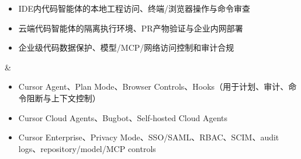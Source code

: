 \begin{longtblr}[
  caption = {北美主流AI智能体安全产品与落地方向},
  label   = {tab:north-america-agent-security-products},
]
\begin{itemize}[leftmargin=*,topsep=0pt,partopsep=0pt,itemsep=1pt,parsep=0pt]
    \item IDE内代码智能体的本地工程访问、终端/浏览器操作与命令审查
    \item 云端代码智能体的隔离执行环境、PR产物验证与企业内网部署
    \item 企业级代码数据保护、模型/MCP/网络访问控制和审计合规
    \end{itemize}
& \begin{itemize}[leftmargin=*,topsep=0pt,partopsep=0pt,itemsep=1pt,parsep=0pt]
    \item Cursor Agent、Plan Mode、Browser Controls、Hooks（用于计划、审计、命令阻断与上下文控制）~\cite{cursor17changelog2025,cursorplanmode2025,cursorhooks2025}
    \item Cursor Cloud Agents、Bugbot、Self-hosted Cloud Agents ~\cite{cursorcloudagents2025,cursorbugbot2025,cursorselfhostedcloudagents2026}
    \item Cursor Enterprise、Privacy Mode、SSO/SAML、RBAC、SCIM、audit logs、repository/model/MCP controls ~\cite{cursorsecurity2026,cursorenterprise2026}
    \end{itemize} \\
\hline
\end{longtblr}
\endgroup
